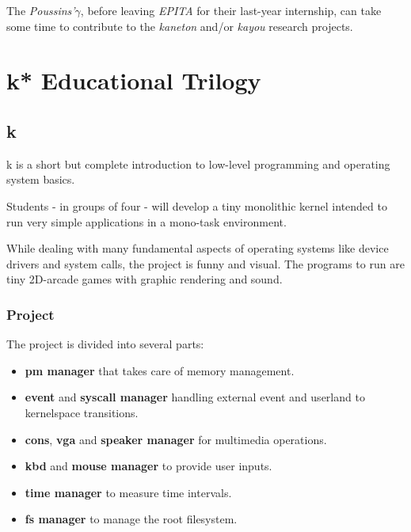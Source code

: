 \begin{multicols}{2}
The \textit{Poussins'$\gamma$}, before leaving \textit{EPITA} for their
last-year internship, can take some time to contribute to the \textit{kaneton}
and/or \textit{kayou} research projects.

%
%

\section{k* Educational Trilogy}

%
%

\subsection{k}

k is a short but complete introduction to low-level programming and
operating system basics.

Students - in groups of four - will develop a tiny monolithic kernel
intended to run very simple applications in a mono-task environment.

While dealing with many fundamental aspects of operating systems like
device drivers and system calls, the project is funny and visual. The
programs to run are tiny 2D-arcade games with graphic rendering and
sound.


\subsubsection{Project}

The project is divided into several parts:

\begin{itemize}
  \item
    \textbf{pm manager} that takes care of memory management.
  \item
    \textbf{event} and \textbf{syscall manager} handling external
    event and userland to kernelspace transitions.
  \item
    \textbf{cons}, \textbf{vga} and \textbf{speaker manager} for
    multimedia operations.
  \item
    \textbf{kbd} and \textbf{mouse manager} to provide user inputs.
  \item
    \textbf{time manager} to measure time intervals.
  \item
    \textbf{fs manager} to manage the root filesystem.
\end{itemize}


\end{multicols}
